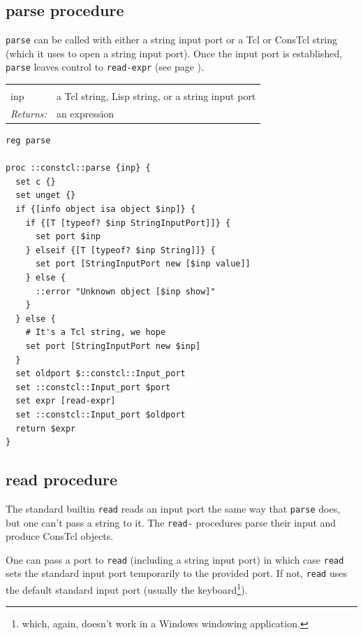 \documentclass[twoside,9pt]{report}
\begin{document}
\subsection{parse procedure}
\label{parse-procedure}


\texttt{parse} can be called with either a string input port or a Tcl or ConsTcl string (which it uses to open a string input port). Once the input port is established, \texttt{parse} leaves control to \texttt{read-expr} (see page \pageref{read-expr-procedure}).

\noindent\begin{tabular}{ |p{1.9cm} p{8cm}| }
\hline
\rowcolor[HTML]{CCCCCC} \multicolumn{2}{|l|}{\bf parse (internal)} \\
inp & a Tcl string, Lisp string, or a string input port \\
\textit{Returns:} & an expression \\
\hline
\end{tabular}
\begin{lstlisting}
reg parse

proc ::constcl::parse {inp} {
  set c {}
  set unget {}
  if {[info object isa object $inp]} {
    if {[T [typeof? $inp StringInputPort]]} {
      set port $inp
    } elseif {[T [typeof? $inp String]]} {
      set port [StringInputPort new [$inp value]]
    } else {
      ::error "Unknown object [$inp show]"
    }
  } else {
    # It's a Tcl string, we hope
    set port [StringInputPort new $inp]
  }
  set oldport $::constcl::Input_port
  set ::constcl::Input_port $port
  set expr [read-expr]
  set ::constcl::Input_port $oldport
  return $expr
}
\end{lstlisting}
\subsection{read procedure}
\label{read-procedure}


The standard builtin \texttt{read} reads an input port the same way that \texttt{parse} does, but one can't pass a string to it. The \texttt{read-} procedures parse their input and produce ConsTcl objects.


One can pass a port to \texttt{read} (including a string input port) in which case \texttt{read} sets the standard input port temporarily to the provided port. If not, \texttt{read} uses the default standard input port (usually the keyboard\footnote{which, again, doesn't work in a Windows windowing application.}).
\end{document}
